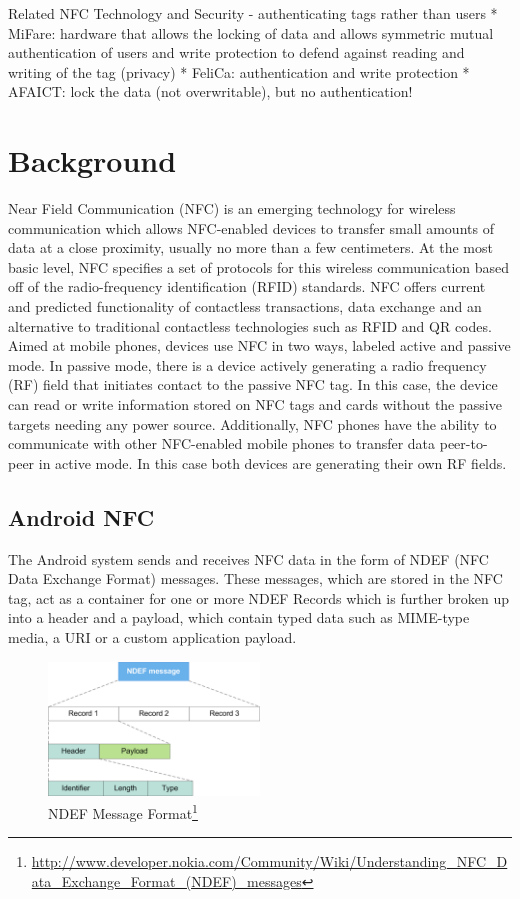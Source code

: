 \documentclass[12pt]{article}
\begin{document}
Related NFC Technology and Security - authenticating tags rather than users
* MiFare: hardware that allows the locking of data and allows symmetric mutual authentication of users and write protection to defend against reading and writing of the tag (privacy)
* FeliCa: authentication and write protection 
* AFAICT: lock the data (not overwritable), but no authentication!

\section{Background}
Near Field Communication (NFC) is an emerging technology for wireless communication which allows NFC-enabled devices to transfer small amounts of data at a close proximity, usually no more than a few centimeters.
At the most basic level, NFC specifies a set of protocols for this wireless communication based off of the radio-frequency identification (RFID) standards.
NFC offers current and predicted functionality of contactless transactions, data exchange and an alternative to traditional contactless technologies such as RFID and QR codes.
Aimed at mobile phones, devices use NFC in two ways, labeled active and passive mode.
In passive mode, there is a device actively generating a radio frequency (RF) field that initiates contact to the passive NFC tag.
In this case, the device can read or write information stored on NFC tags and cards without the passive targets needing any power source.
Additionally, NFC phones have the ability to communicate with other NFC-enabled mobile phones to transfer data peer-to-peer in active mode.
In this case both devices are generating their own RF fields.

\subsection{Android NFC}

The Android system sends and receives NFC data in the form of NDEF (NFC Data Exchange Format) messages. These messages, which are stored in the NFC tag, act as a container for one or more NDEF Records which is further broken up into a header and a payload, which contain typed data such as MIME-type media, a URI or a custom application payload.

\begin{figure}[h!]
\begin{minipage}{\textwidth}
	\centering
		\includegraphics[width=0.5\textwidth]{NDEF_Format.png}
	\caption[Caption for LOF]%
		{NDEF Message Format\footnote{\url{http://www.developer.nokia.com/Community/Wiki/Understanding_NFC_Data_Exchange_Format_(NDEF)_messages}}}

\end{minipage} 
\end{figure}
\end{document}
